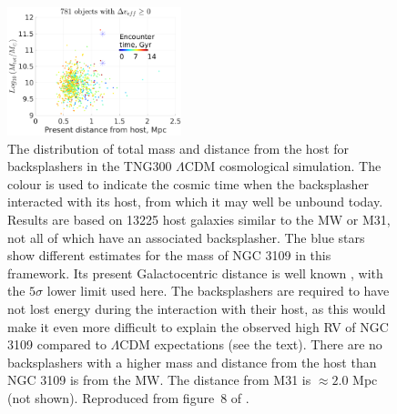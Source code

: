 \documentclass[fleqn,usenatbib,useAMS,onecolumn]{mnras} %
\begin{document}
\begin{figure}
	\centering
	\includegraphics[width=0.45\textwidth]{Banik_2021_backplash_Figure_8}
	\caption{The distribution of total mass and distance from the host for backsplashers in the TNG300 $\Lambda$CDM cosmological simulation. The colour is used to indicate the cosmic time when the backsplasher interacted with its host, from which it may well be unbound today. Results are based on 13225 host galaxies similar to the MW or M31, not all of which have an associated backsplasher. The blue stars show different estimates for the mass of NGC 3109 in this framework. Its present Galactocentric distance is well known \citep{Soszynski_2006, Dalcanton_2009}, with the $5\sigma$ lower limit used here. The backsplashers are required to have not lost energy during the interaction with their host, as this would make it even more difficult to explain the observed high RV of NGC 3109 compared to $\Lambda$CDM expectations (see the text). There are no backsplashers with a higher mass and distance from the host than NGC 3109 is from the MW. The distance from M31 is $\approx 2.0$ Mpc (not shown). Reproduced from figure~8 of \citet{Banik_2021_backsplash}.}
	\label{Banik_2021_backplash_Figure_8}
\end{figure}
\end{document}
